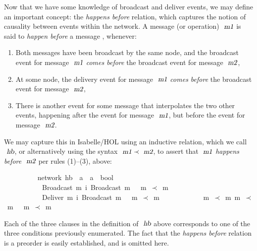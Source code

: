 \documentclass[acmlarge,review,anonymous]{acmart}\settopmatter{printfolios=true}
\begin{document}
Now that we have some knowledge of broadcast and deliver events, we may define an important concept: the \emph{happens before} relation, which captures the notion of causality between events within the network.
A message (or operation) $\isa{m1}$ is said to \emph{happen before} a message , whenever:
\begin{enumerate}
\item
Both messages have been broadcast by the same node, and the broadcast event for message $\isa{m1}$ \emph{comes before} the broadcast event for message $\isa{m2}$,
\item
At some node, the delivery event for message $\isa{m1}$ \emph{comes before} the broadcast event for message $\isa{m2}$,
\item
There is another event for some message that interpolates the two other events, happening after the event for message $\isa{m1}$, but before the event for message $\isa{m2}$.
\end{enumerate}
We may capture this in Isabelle/HOL using an inductive relation, which we call $\isa{hb}$, or alternatively using the syntax $\isa{m1} \prec \isa{m2}$, to assert that $\isa{m1}$ \emph{happens before} $\isa{m2}$ per rules (1)--(3), above:
\\
\begin{isabellebody}
\ \ \ \ \ \ \ \  {\isacharparenleft}\ network{\isacharparenright}\ hb\ {\isacharcolon}{\isacharcolon}\ {\isachardoublequoteopen}{\isacharprime}a\ {\isasymRightarrow}\ {\isacharprime}a\ {\isasymRightarrow}\ bool{\isachardoublequoteclose}\ \isanewline
\ \ \ \ \ \ \ \ \ \ {\isachardoublequoteopen}{\isasymlbrakk}\ Broadcast\ m{}\ {\isasymsqsubset}\isactrlsup i\ Broadcast\ m{}\ {\isasymrbrakk}\ {\isasymLongrightarrow}\ m{}\ $\prec$\ m{}{\isachardoublequoteclose}\ {\isacharbar}\isanewline
\ \ \ \ \ \ \ \ \ \ {\isachardoublequoteopen}{\isasymlbrakk}\ Deliver\ m{}\ {\isasymsqsubset}\isactrlsup i\ Broadcast\ m{}\ {\isasymrbrakk}\ {\isasymLongrightarrow}\ m{}\ $\prec$\ m{}{\isachardoublequoteclose}\ {\isacharbar}\isanewline
\ \ \ \ \ \ \ \ \ \ {\isachardoublequoteopen}{\isasymlbrakk}\ m{}\ $\prec$\  m{}{\isacharsemicolon}\ m{}\ $\prec$\ m{}\ {\isasymrbrakk}\ {\isasymLongrightarrow}\ m{}\ $\prec$\ m{}{\isachardoublequoteclose}
\end{isabellebody}
\vspace{\baselineskip}
Each of the three clauses in the definition of $\isa{hb}$ above corresponds to one of the three conditions previously enumerated.
The fact that the \emph{happens before} relation is a preorder is easily established, and is omitted here.
\end{document}
